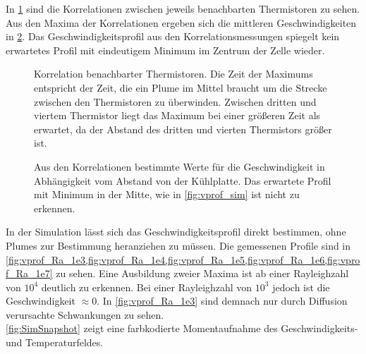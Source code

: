 In \cref{fig:korr} sind die Korrelationen zwischen jeweils benachbarten Thermistoren zu sehen. Aus den Maxima der Korrelationen ergeben sich die mittleren Geschwindigkeiten in \cref{fig:v_korr}.
Das Geschwindigkeitsprofil aus den Korrelationsmessungen spiegelt kein erwartetes Profil mit eindeutigem Minimum im Zentrum der Zelle wieder.
\\
\begin{figure}
	\caption{Korrelation benachbarter Thermistoren. Die Zeit der Maximums entspricht der Zeit, die ein Plume im Mittel braucht um die Strecke zwischen den Thermistoren zu überwinden. Zwischen dritten und viertem Thermistor liegt das Maximum bei einer größeren Zeit als erwartet, da der Abstand des dritten und vierten Thermistors größer ist.}\label{fig:korr}
\end{figure}
\begin{figure}
	\caption{Aus den Korrelationen bestimmte Werte für die Geschwindigkeit in Abhängigkeit vom Abstand von der Kühlplatte. Das erwartete Profil mit Minimum in der Mitte, wie in \cref{fig:vprof_sim} ist nicht zu erkennen.}\label{fig:v_korr}
\end{figure}
In der Simulation lässt sich das Geschwindigkeitsprofil direkt bestimmen, ohne Plumes zur Bestimmung heranziehen zu müssen.
Die gemessenen Profile sind in \cref{fig:vprof_Ra_1e3,fig:vprof_Ra_1e4,fig:vprof_Ra_1e5,fig:vprof_Ra_1e6,fig:vprof_Ra_1e7} zu sehen. 
Eine Ausbildung zweier Maxima ist ab einer Rayleighzahl von $10^4$ deutlich zu erkennen. 
Bei einer Rayleighzahl von $10^3$ jedoch ist die Geschwindigkeit $\approx 0$. 
In \cref{fig:vprof_Ra_1e3} sind demnach nur durch Diffusion verursachte Schwankungen zu sehen.
\\
\cref{fig:SimSnapshot} zeigt eine farbkodierte Momentaufnahme des Geschwindigkeits- und Temperaturfeldes. 
\\

